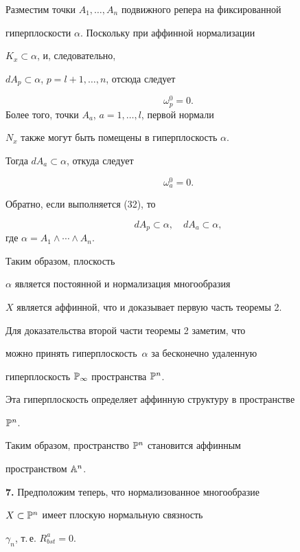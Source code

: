 \begin{pf}
Разместим точки $A_1, \dotsc, A_n$ подвижного репера на фиксированной


гиперплоскости $\alpha$. Поскольку при аффинной нормализации


$K_x \subset \alpha$, и, следовательно,


$dA_p \subset \alpha$, $p =l+1, \dotsc, n$, отсюда следует


$$


\omega_p^0 = 0.


$$
Более того, точки $A_a$, $a = 1, \dotsc, l$, первой нормали


$N_x$ также могут быть помещены в гиперплоскость $\alpha$.


Тогда $dA_a \subset \alpha$, откуда следует


$$


\omega_a^0 = 0.


$$

Обратно, если выполняется (32), то


$$
dA_p \subset \alpha, \quad d A_a \subset \alpha,
$$
где $\alpha = A_1 \wedge \dotsb \wedge A_n$.


Таким образом, плоскость


$\alpha$ является постоянной и нормализация многообразия


$X$ является аффинной, что и доказывает первую часть теоремы 2.





Для доказательства второй части теоремы 2 заметим, что


можно принять гиперплоскость~$\alpha$ за бесконечно удаленную


гиперплоскость $\Bbb{P}_\infty$ пространства $\Bbb{P}^n$.


Эта гиперплоскость определяет аффинную структуру в пространстве


$\Bbb{P}^n$.


Таким образом, пространство $\Bbb{P}^n$ становится аффинным


пространством $\Bbb{A}^n$.


\end{pf}





{\bf 7.} Предположим теперь, что нормализованное многообразие


$X \subset \Bbb{P}^n$ имеет плоскую нормальную связность


$\gamma_n$, т.\,е. $R^a_{bst} = 0$.


